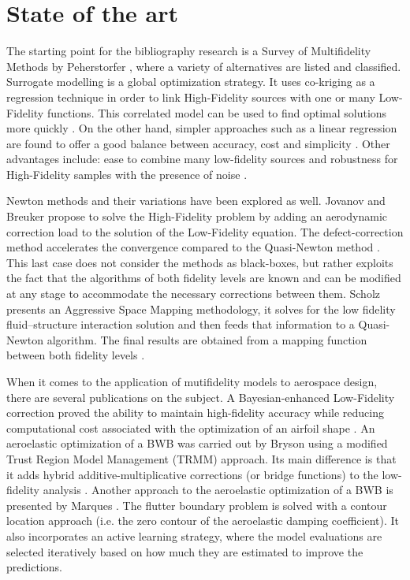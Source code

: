 \section{State of the art}
\label{sec:state}
The starting point for the bibliography research is a Survey of Multifidelity Methods by Peherstorfer \cite{peherstorfer2018survey}, where a variety of alternatives are listed and classified. Surrogate modelling is a global optimization strategy. It uses co-kriging as a regression technique in order to link High-Fidelity sources with one or many Low-Fidelity functions. This correlated model can be used to find optimal solutions more quickly \cite{Forrester2007}. On the other hand, simpler approaches such as a linear regression are found to offer a good balance between accuracy, cost and simplicity \cite{Zhang2019}. Other advantages include: ease to combine many low-fidelity sources and robustness for High-Fidelity samples with the presence of noise \cite{Zhang2019}. \par
Newton methods and their variations have been explored as well. Jovanov and Breuker propose to solve the High-Fidelity problem by adding an aerodynamic correction load to the solution of the Low-Fidelity equation. The defect-correction method accelerates the convergence compared to the Quasi-Newton method \cite{Jovanov2015}. This last case does not consider the methods as black-boxes, but rather exploits the fact that the algorithms of both fidelity levels are known and can be modified at any stage to accommodate the necessary corrections between them. Scholz presents an Aggressive Space Mapping methodology, it solves for the low fidelity fluid–structure interaction solution and then feeds that information to a Quasi-Newton algorithm. The final results are obtained from a mapping function between both fidelity levels \cite{Scholcz2014}. \par
When it comes to the application of mutifidelity models to aerospace design, there are several publications on the subject. A Bayesian-enhanced Low-Fidelity correction proved the ability to maintain high-fidelity accuracy while reducing computational cost associated with the optimization of an airfoil shape \cite{fischer2018bayesian}. An aeroelastic optimization of a BWB was carried out by Bryson \cite{Bryson2019} using a modified Trust Region Model Management (TRMM) approach. Its main difference is that it adds hybrid additive-multiplicative corrections (or bridge functions) to the low-fidelity analysis \cite{Bryson2019a}. Another approach to the aeroelastic optimization of a BWB is presented by Marques \cite{Marques2019}. The flutter boundary problem is solved with a contour location approach (i.e. the zero contour of the aeroelastic damping coefficient). It also incorporates an active learning strategy, where the model evaluations are selected iteratively based on how much they are estimated to improve the predictions. \par


